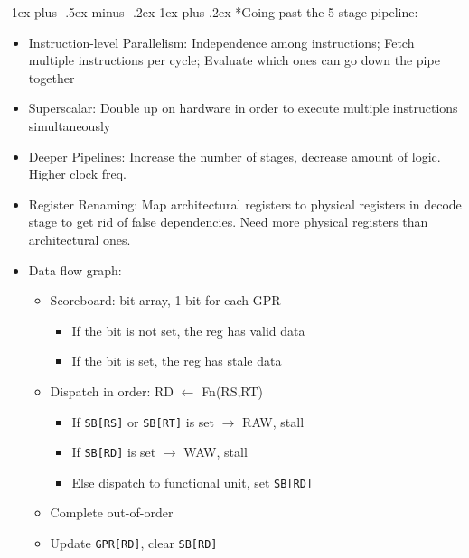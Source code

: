 \documentclass[landscape,10pt]{article}
\makeatletter
\renewcommand{\subsubsection}{\@startsection{subsubsection}{3}{0mm}%
            {-1ex plus -.5ex minus -.2ex}%
            {1ex plus .2ex}%
            {\normalfont\small\bfseries}}
\newcommand{\code}[1]{\texttt{#1}}
\makeatother
\begin{document}
\begin{multicols}{4}
\subsubsection*{Going past the 5-stage pipeline:}
\begin{itemize}
    \item[] Instruction-level Parallelism: Independence among instructions; Fetch multiple instructions per cycle; Evaluate which ones can go down the pipe together
    \item[] Superscalar: Double up on hardware in order to execute multiple instructions simultaneously
    \item[] Deeper Pipelines: Increase the number of stages, decrease amount of logic. Higher clock freq.
    \item[] Register Renaming: Map architectural registers to physical registers in decode stage to get rid of false dependencies. Need more physical registers than architectural ones.
    \item[] Data flow graph:
    \begin{itemize}
        \item[] Scoreboard: bit array, 1-bit for each GPR
        \begin{itemize}
            \item[] If the bit is not set, the reg has valid data
            \item[] If the bit is set, the reg has stale data
        \end{itemize}
        \item[] Dispatch in order: RD \(\leftarrow\) Fn(RS,RT)
        \begin{itemize}
            \item[] If \code{SB[RS]} or \code{SB[RT]} is set \(\rightarrow\) RAW, stall
            \item[] If \code{SB[RD]} is set \(\rightarrow\) WAW, stall
            \item[] Else dispatch to functional unit, set \code{SB[RD]}
        \end{itemize}
        \item[] Complete out-of-order
        \item[] Update \code{GPR[RD]}, clear \code{SB[RD]}
    \end{itemize}
\end{itemize}


\end{multicols}
\end{document}
